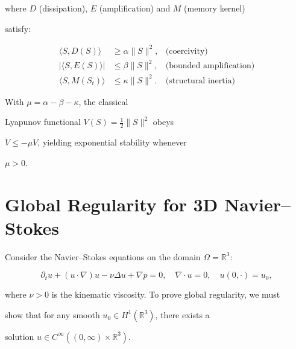﻿\documentclass[11pt,a4paper]{amsart}
\newcommand{\alphacoeff}{\ensuremath{\alpha}}
\newcommand{\betacoeff}{\ensuremath{\beta}}
\newcommand{\kappacoeff}{\ensuremath{\kappa}}
\newcommand{\mumargin}{\ensuremath{\mu}}
\begin{document}
where $D$ (dissipation), $E$ (amplification) and $M$ (memory kernel)

satisfy:

\begin{align}

 \langle S,D(S)\rangle &\ge \alphacoeff\|S\|^{2},

 &\text{(coercivity)}\\

 |\langle S,E(S)\rangle| &\le \betacoeff\|S\|^{2},

 &\text{(bounded amplification)}\\

 \langle S,M(S_t)\rangle &\le \kappacoeff\|S\|^{2}.

 &\text{(structural inertia)}

\end{align}

With $\mumargin=\alphacoeff-\betacoeff-\kappacoeff$, the classical

Lyapunov functional $V(S)=\tfrac12\|S\|^{2}$ obeys

$\dot V\le -\mumargin V$, yielding exponential stability whenever

$\mumargin>0$.




\section{Global Regularity for 3D Navier--Stokes}

Consider the Navier--Stokes equations on the domain $\Omega = \mathbb{R}^3$:

\begin{equation}

 \partial_t u + (u \cdot \nabla) u - \nu \Delta u + \nabla p = 0,

 \quad \nabla \cdot u = 0,

 \quad u(0, \cdot) = u_0,

\end{equation}

where $\nu > 0$ is the kinematic viscosity. To prove global regularity, we must

show that for any smooth $u_0 \in H^1(\mathbb{R}^3)$, there exists a

solution $u \in C^{\infty}((0, \infty) \times \mathbb{R}^3)$.
\end{document}

